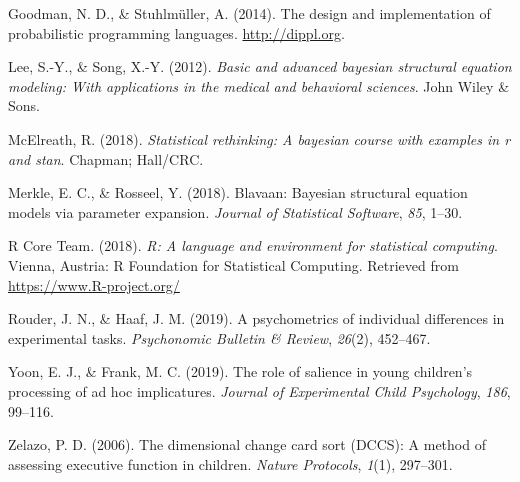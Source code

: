 \documentclass[
  english,
  man,floatsintext]{apa6}
\newlength{\cslhangindent}
\newlength{\cslentryspacingunit} %
\newenvironment{CSLReferences}[2] %
 {%
  \setlength{\parindent}{0pt}
  \ifodd #1
  \let\oldpar\par
  \def\par{\hangindent=\cslhangindent\oldpar}
  \fi
  \setlength{\parskip}{#2\cslentryspacingunit}
 }%
 {}
\begin{document}
\begin{CSLReferences}{1}{0}
\leavevmode{}%
Goodman, N. D., \& Stuhlmüller, A. (2014). {The design and implementation of probabilistic programming languages}. \url{http://dippl.org}.

\leavevmode{}%
Lee, S.-Y., \& Song, X.-Y. (2012). \emph{Basic and advanced bayesian structural equation modeling: With applications in the medical and behavioral sciences}. John Wiley \& Sons.

\leavevmode{}%
McElreath, R. (2018). \emph{Statistical rethinking: A bayesian course with examples in r and stan}. Chapman; Hall/CRC.

\leavevmode{}%
Merkle, E. C., \& Rosseel, Y. (2018). Blavaan: Bayesian structural equation models via parameter expansion. \emph{Journal of Statistical Software}, \emph{85}, 1--30.

\leavevmode{}%
R Core Team. (2018). \emph{R: A language and environment for statistical computing}. Vienna, Austria: R Foundation for Statistical Computing. Retrieved from \url{https://www.R-project.org/}

\leavevmode{}%
Rouder, J. N., \& Haaf, J. M. (2019). A psychometrics of individual differences in experimental tasks. \emph{Psychonomic Bulletin \& Review}, \emph{26}(2), 452--467.

\leavevmode{}%
Yoon, E. J., \& Frank, M. C. (2019). The role of salience in young children's processing of ad hoc implicatures. \emph{Journal of Experimental Child Psychology}, \emph{186}, 99--116.

\leavevmode{}%
Zelazo, P. D. (2006). The dimensional change card sort (DCCS): A method of assessing executive function in children. \emph{Nature Protocols}, \emph{1}(1), 297--301.

\end{CSLReferences}

\endgroup
\end{document}
